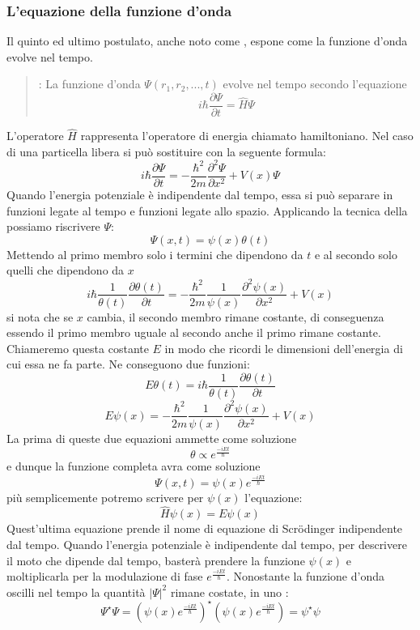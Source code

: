 \subsubsection{L'equazione della funzione d'onda}
Il quinto ed ultimo postulato, anche noto come \textbf{}, espone come la funzione d'onda evolve nel tempo.
\begin{quote}
  \textbf{}: La funzione d'onda $\Psi(r_1, r_2, ..., t)$ evolve nel tempo secondo l'equazione
  $$i\hbar \frac{\partial \Psi}{\partial t} = \hat{H} \Psi$$
\end{quote}
L'operatore $\hat{H}$ rappresenta l'operatore di energia chiamato hamiltoniano. Nel caso di una particella libera si può sostituire con la seguente formula:
$$i \hbar \frac{\partial \Psi}{\partial t} = - \frac{\hbar^2}{2 m} \frac{\partial^2 \Psi}{\partial x^2} + V(x) \Psi$$
Quando l'energia potenziale è indipendente dal tempo, essa si può separare in funzioni legate al tempo e funzioni legate allo spazio. Applicando la tecnica della \textbf{} possiamo riscrivere $\Psi$:
$$\Psi(x, t) = \psi(x) \theta(t)$$
Mettendo al primo membro solo i termini che dipendono da $t$ e al secondo solo quelli che dipendono da $x$
$$i \hbar \frac{1}{\theta(t)} \frac{\partial \theta(t)}{\partial t} = - \frac{\hbar^2}{2 m} \frac{1}{\psi(x)} \frac{\partial^2 \psi(x)}{\partial x^2} + V(x)$$
si nota che se $x$ cambia, il secondo membro rimane costante, di conseguenza essendo il primo membro uguale al secondo anche il primo rimane costante. Chiameremo questa costante $E$ in modo che ricordi le dimensioni dell'energia di cui essa ne fa parte. Ne conseguono due funzioni:
$$E \theta(t) = i \hbar \frac{1}{\theta(t)} \frac{\partial \theta(t)}{\partial t}$$
$$E \psi(x) = - \frac{\hbar^2}{2 m} \frac{1}{\psi(x)} \frac{\partial^2 \psi(x)}{\partial x^2} + V(x)$$
La prima di queste due equazioni ammette come soluzione
$$\theta \propto e^{\frac{-i E t}{\hbar}}$$
e dunque la funzione completa avra come soluzione
$$\Psi(x, t) = \psi(x) e^{\frac{-i E t}{\hbar}}$$
più semplicemente potremo scrivere per $\psi(x)$ l'equazione:
$$\hat{H} \psi(x) = E \psi(x)$$
Quest'ultima equazione prende il nome di equazione di Scr\"odinger indipendente dal tempo.
Quando l'energia potenziale è indipendente dal tempo, per descrivere il moto che dipende dal tempo, basterà prendere la funzione $\psi(x)$ e moltiplicarla per la modulazione di fase $e^{\frac{-i E t}{\hbar}}$. Nonostante la funzione d'onda oscilli nel tempo la quantità ${\left|\Psi\right|}^2$ rimane costate, in uno \textbf{}:
$$\Psi^{\star} \Psi = {\left(\psi(x) e^{\frac{-i E t}{\hbar}}\right)}^{\star} \left(\psi(x) e^{\frac{-i E t}{\hbar}}\right) = \psi^{\star} \psi$$
